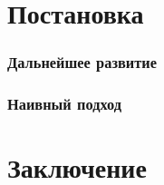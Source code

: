 
\pagebreak

\section{Постановка}

\subsubsection{Дальнейшее развитие}

\subsubsection{Наивный подход}

\section{Заключение}
